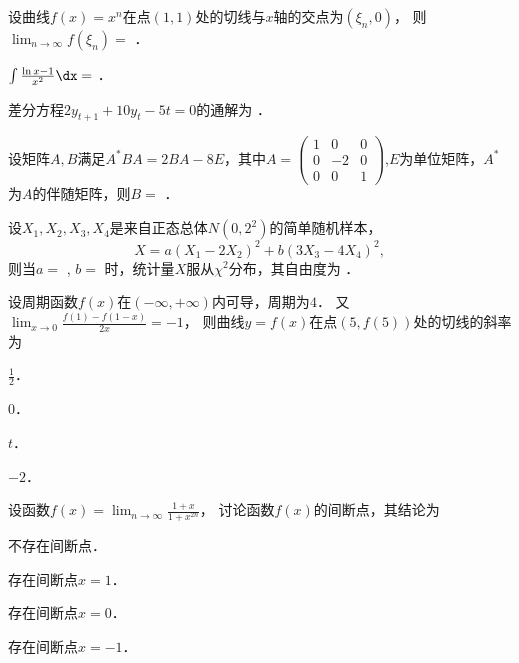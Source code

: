 \documentclass[plain,noanswer,medmath]{../../template/jnuexam}
\begin{document}






\begin{problem}
设曲线$f(x) = x^n$在点$(1,1)$处的切线与$x$轴的交点为$(\xi_n,0)$，
则$\lim_{n \to \infty} f(\xi_n) =$ \fillin{}．
\end{problem}


\begin{problem}
$\int \frac{\ln x - 1}{x^2} \dx =$ \fillin{}．
\end{problem}


\begin{problem}
差分方程$2y_{t + 1} + 10y_t - 5t = 0$的通解为 \fillin{}．
\end{problem}


\begin{problem}
设矩阵$A,B$满足$A^* BA = 2BA - 8E$，其中$A = \begin{pmatrix}
  1 &  0 & 0 \\
  0 & -2 & 0 \\
  0 &  0 & 1
\end{pmatrix}$,$E$为单位矩阵，$A^*$为$A$的伴随矩阵，则$B =$ \fillin{}．
\end{problem}


\begin{problem}
设$X_1,X_2,X_3,X_4$是来自正态总体$N\left(0,2^2 \right)$的简单随机样本，
$$X = a\left(X_1 - 2X_2 \right)^2 + b\left(3X_3 - 4X_4 \right)^2,$$
则当$a=$ \fillin{}, $b=$ \fillin{}时，统计量$X$服从$\chi^2$分布，其自由度为 \fillin{}．
\end{problem}




\begin{problem}
设周期函数$f(x)$在$\left(-\infty , +\infty \right)$内可导，周期为$4$．
又$\lim_{x \to 0} \frac{f(1) - f(1 - x)}{2x} = - 1$，
则曲线$y = f(x)$在点$\left(5,f(5) \right)$处的切线的斜率为\pickout{}
\begin{abcd}
\item $\frac{1}{2}$．
\item $0$．
\item $t$．
\item $- 2$．
\end{abcd}
\end{problem}


\begin{problem}
设函数$f(x) = \lim_{n \to \infty} \frac{1 + x}{1 + x^{2n}}$，
讨论函数$f(x)$的间断点，其结论为\pickout{}
\begin{abcd}
\item 不存在间断点．
\item 存在间断点$x = 1$．
\item 存在间断点$x = 0$．
\item 存在间断点$x = - 1$．
\end{abcd}
\end{problem}
\end{document}
